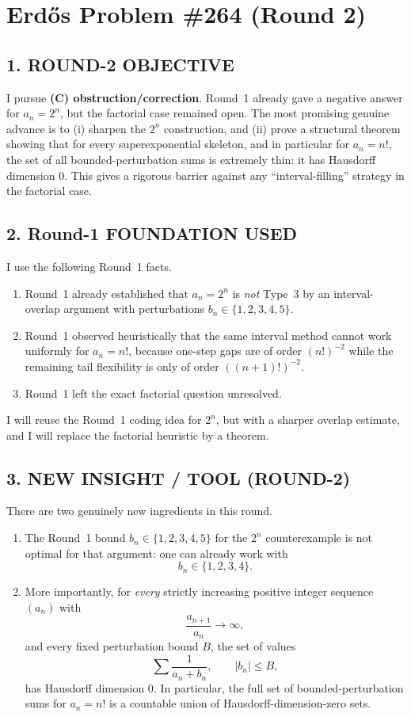 \section*{Erd\H{o}s Problem \#264 (Round 2)}

\subsection*{1. ROUND-2 OBJECTIVE}

I pursue \textbf{(C) obstruction/correction}.  Round~1 already gave a negative answer for
$a_n=2^n$, but the factorial case remained open.  The most promising genuine advance is to
(i) sharpen the $2^n$ construction, and
(ii) prove a structural theorem showing that for every superexponential skeleton, and in particular
for $a_n=n!$, the set of all bounded-perturbation sums is extremely thin: it has Hausdorff dimension $0$.
This gives a rigorous barrier against any ``interval-filling'' strategy in the factorial case.

\subsection*{2. Round-1 FOUNDATION USED}

I use the following Round~1 facts.

\begin{enumerate}
\item Round~1 already established that $a_n=2^n$ is \emph{not} Type~3 by an interval-overlap argument with perturbations $b_n\in\{1,2,3,4,5\}$.
\item Round~1 observed heuristically that the same interval method cannot work uniformly for $a_n=n!$, because one-step gaps are of order $(n!)^{-2}$ while the remaining tail flexibility is only of order $((n+1)!)^{-2}$.
\item Round~1 left the exact factorial question unresolved.
\end{enumerate}

I will reuse the Round~1 coding idea for $2^n$, but with a sharper overlap estimate, and I will replace the factorial heuristic by a theorem.

\subsection*{3. NEW INSIGHT / TOOL (ROUND-2)}

There are two genuinely new ingredients in this round.

\begin{enumerate}
\item The Round~1 bound $b_n\in\{1,2,3,4,5\}$ for the $2^n$ counterexample is not optimal for that argument: one can already work with
\[
 b_n\in\{1,2,3,4\}.
\]
\item More importantly, for \emph{every} strictly increasing positive integer sequence $(a_n)$ with
\[
 \frac{a_{n+1}}{a_n}\to\infty,
\]
and every fixed perturbation bound $B$, the set of values
\[
 \sum \frac{1}{a_n+b_n},\qquad |b_n|\le B,
\]
has Hausdorff dimension $0$.  In particular, the full set of bounded-perturbation sums for $a_n=n!$ is a countable union of Hausdorff-dimension-zero sets.
\end{enumerate}

